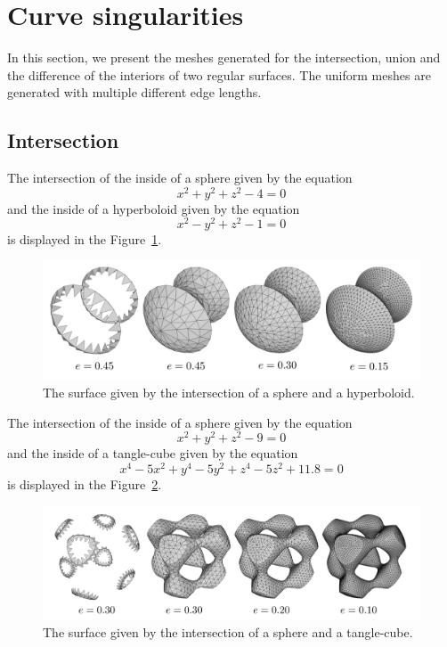 \section{Curve singularities}
In this section, we present the meshes generated for the intersection, union 
and the difference of the interiors of two regular surfaces.
The uniform meshes are generated with multiple different edge lengths.

\subsection{Intersection}
The intersection of the inside of a sphere given by the equation
$$x^2+y^2+z^2-4=0$$ and the inside of a hyperboloid given by the 
equation $$x^2-y^2+z^2-1=0$$ is displayed in the Figure~\ref{img:71}.

\begin{figure}[h!]
    \centerline{\includegraphics[scale=0.5]{images/img71}}
    \caption[The surface given by the intersection of a sphere and a hyperboloid]
    {The surface given by the intersection of a sphere and a hyperboloid.}
    \label{img:71}
\end{figure}

The intersection of the inside of a sphere given by the equation
$$x^2+y^2+z^2-9=0$$ and the inside of a tangle-cube given by the 
equation $$x^4-5x^2+y^4-5y^2+z^4-5z^2+11.8=0$$ is displayed in the Figure~\ref{img:73}.

\begin{figure}[h!]
    \centerline{\includegraphics[scale=0.5]{images/img73}}
    \caption[The surface given by the intersection of a sphere and a tangle-cube]
    {The surface given by the intersection of a sphere and a tangle-cube.}
    \label{img:73}
\end{figure}

